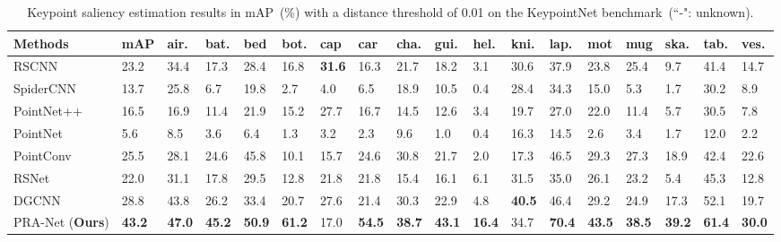 \documentclass[journal]{IEEEtran}
\begin{document}
\begin{table*}[t]
\small
\centering
\caption{Keypoint saliency estimation results in mAP~(\%) with a distance threshold of 0.01 on the KeypointNet benchmark~(``-": unknown).}
\label{table:KeypointNet_mAP}
\begin{tabular}{|l|*{1}p{0.96cm}<{\centering}|
*{1}p{0.45cm}<{\centering}*{1}p{0.45cm}<{\centering}*{1}p{0.45cm}<{\centering}*{1}p{0.45cm}<{\centering}
*{1}p{0.45cm}<{\centering}*{1}p{0.45cm}<{\centering}*{1}p{0.45cm}<{\centering}*{1}p{0.45cm}<{\centering}
*{1}p{0.45cm}<{\centering}*{1}p{0.45cm}<{\centering}*{1}p{0.45cm}<{\centering}*{1}p{0.45cm}<{\centering}
*{1}p{0.45cm}<{\centering}*{1}p{0.45cm}<{\centering}*{1}p{0.45cm}<{\centering}*{1}p{0.45cm}<{\centering}
|}

\hline
Methods & mAP & air. & bat. & bed & bot. & cap & car & cha. & gui. & hel. & kni. & lap. & mot & mug & ska. & tab. & ves.\\
\hline
\hline
RSCNN~\cite{liu2019relation}& 23.2 & 34.4 & 17.3 & 28.4 & 16.8 & \textbf{31.6} & 16.3 & 21.7 & 18.2 & 3.1 & 30.6 & 37.9 & 23.8 & 25.4 & 9.7 & 41.4 & 14.7 \\
SpiderCNN~\cite{xu2018spidercnn} & 13.7 & 25.8 & 6.7 & 19.8 & 2.7 & 4.0 & 6.5 & 18.9 & 10.5 & 0.4 & 28.4 & 34.3 & 15.0 & 5.3 & 1.7 & 30.2 & 8.9 \\
PointNet++~\cite{qi2017pointnet++} & 16.5 & 16.9 & 11.4 & 21.9 & 15.2 & 27.7 & 16.7 & 14.5 & 12.6 & 3.4 & 19.7 & 27.0 & 22.0 & 11.4 & 5.7 & 30.5 & 7.8\\
PointNet~\cite{qi2017pointnet} & 5.6 & 8.5 & 3.6 & 6.4 & 1.3 & 3.2 & 2.3 & 9.6 & 1.0 & 0.4 & 16.3 & 14.5 & 2.6 & 3.4 & 1.7 & 12.0 & 2.2\\
PointConv~\cite{wu2019pointconv} & 25.5 & 28.1 & 24.6 & 45.8 & 10.1 & 15.7 & 24.6 & 30.8 & 21.7 & 2.0 & 17.3 & 46.5 & 29.3 & 27.3 & 18.9 & 42.4 & 22.6\\
RSNet~\cite{huang2018recurrent} & 22.0 & 31.1 & 17.8 & 29.5 & 12.8 & 21.8 & 21.8 & 15.4 & 16.1 & 6.1 & 31.5 & 35.0 & 26.1 & 23.2 & 5.4 & 45.3 & 12.8\\
DGCNN~\cite{wang2019dynamic} & 28.8 & 43.8 & 26.2 & 33.4 & 20.7 & 27.6 & 21.4 & 30.3 & 22.9 & 4.8 & \textbf{40.5} & 46.4 & 29.2 & 24.9 & 17.3 & 52.1 & 19.7\\
\hline
PRA-Net (\textbf{Ours}) & \textbf{43.2} & \textbf{47.0} & \textbf{45.2} & \textbf{50.9} & \textbf{61.2} & 17.0 & \textbf{54.5} & \textbf{38.7} & \textbf{43.1} & \textbf{16.4} & 34.7 & \textbf{70.4} & \textbf{43.5} & \textbf{38.5} & \textbf{39.2} & \textbf{61.4} & \textbf{30.0} \\
\hline
\end{tabular}
\end{table*}
\end{document}
